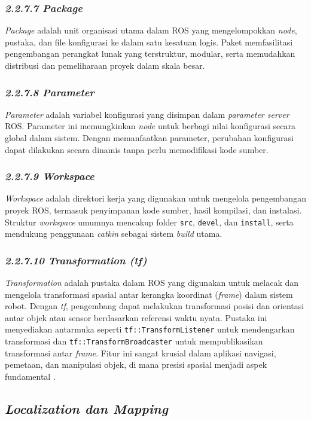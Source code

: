 \subsubsection{\emph{2.2.7.7 Package}}
\emph{Package} adalah unit organisasi utama dalam ROS yang mengelompokkan \emph{node}, pustaka, dan file konfigurasi ke dalam satu kesatuan logis. Paket memfasilitasi pengembangan perangkat lunak yang terstruktur, modular, serta memudahkan distribusi dan pemeliharaan proyek dalam skala besar.

\subsubsection{\emph{2.2.7.8 Parameter}}
\emph{Parameter} adalah variabel konfigurasi yang disimpan dalam \emph{parameter server} ROS. Parameter ini memungkinkan \emph{node} untuk berbagi nilai konfigurasi secara global dalam sistem. Dengan memanfaatkan parameter, perubahan konfigurasi dapat dilakukan secara dinamis tanpa perlu memodifikasi kode sumber.

\subsubsection{\emph{2.2.7.9 Workspace}}
\emph{Workspace} adalah direktori kerja yang digunakan untuk mengelola pengembangan proyek ROS, termasuk penyimpanan kode sumber, hasil kompilasi, dan instalasi. Struktur \emph{workspace} umumnya mencakup folder \texttt{src}, \texttt{devel}, dan \texttt{install}, serta mendukung penggunaan \emph{catkin} sebagai sistem \emph{build} utama.

\subsubsection{\emph{2.2.7.10 Transformation (tf)}}
\emph{Transformation} adalah pustaka dalam ROS yang digunakan untuk melacak dan mengelola transformasi spasial antar kerangka koordinat (\emph{frame}) dalam sistem robot. Dengan \emph{tf}, pengembang dapat melakukan transformasi posisi dan orientasi antar objek atau sensor berdasarkan referensi waktu nyata. Pustaka ini menyediakan antarmuka seperti \texttt{tf::TransformListener} untuk mendengarkan transformasi dan \texttt{tf::TransformBroadcaster} untuk mempublikasikan transformasi antar \emph{frame}. Fitur ini sangat krusial dalam aplikasi navigasi, pemetaan, dan manipulasi objek, di mana presisi spasial menjadi aspek fundamental \cite{ros_noetic}.

\subsection{\emph{Localization dan Mapping}}

